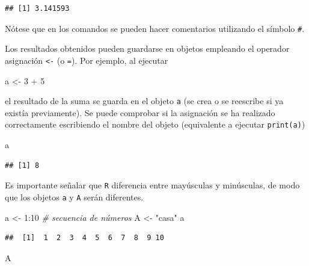 \documentclass[
]{book}
\newenvironment{Shaded}{\begin{snugshade}}{\end{snugshade}}
\newcommand{\CommentTok}[1]{\textcolor[rgb]{0.56,0.35,0.01}{\textit{#1}}}
\newcommand{\DecValTok}[1]{\textcolor[rgb]{0.00,0.00,0.81}{#1}}
\newcommand{\NormalTok}[1]{#1}
\newcommand{\OtherTok}[1]{\textcolor[rgb]{0.56,0.35,0.01}{#1}}
\newcommand{\SpecialCharTok}[1]{\textcolor[rgb]{0.00,0.00,0.00}{#1}}
\newcommand{\StringTok}[1]{\textcolor[rgb]{0.31,0.60,0.02}{#1}}
\theoremstyle{break}
\theoremstyle{nonumberplain}
\begin{document}
\begin{verbatim}
## [1] 3.141593
\end{verbatim}

Nótese que en los comandos se pueden hacer comentarios utilizando el símbolo \texttt{\#}.

Los resultados obtenidos pueden guardarse en objetos empleando el operador asignación \texttt{\textless{}-} (o \texttt{=}).
Por ejemplo, al ejecutar

\begin{Shaded}
\begin{Highlighting}[]
\NormalTok{a }\OtherTok{\textless{}{-}} \DecValTok{3} \SpecialCharTok{+} \DecValTok{5}
\end{Highlighting}
\end{Shaded}

el resultado de la suma se guarda en el objeto \texttt{a} (se crea o se reescribe si ya existía previamente).
Se puede comprobar si la asignación se ha realizado correctamente escribiendo el nombre del objeto (equivalente a ejecutar \texttt{print(a)})

\begin{Shaded}
\begin{Highlighting}[]
\NormalTok{a}
\end{Highlighting}
\end{Shaded}

\begin{verbatim}
## [1] 8
\end{verbatim}

Es importante señalar que \texttt{R} diferencia entre mayúsculas y
minúsculas, de modo que los objetos \texttt{a} y \texttt{A} serán diferentes.

\begin{Shaded}
\begin{Highlighting}[]
\NormalTok{a }\OtherTok{\textless{}{-}} \DecValTok{1}\SpecialCharTok{:}\DecValTok{10} \CommentTok{\# secuencia de números}
\NormalTok{A }\OtherTok{\textless{}{-}} \StringTok{"casa"}
\NormalTok{a}
\end{Highlighting}
\end{Shaded}

\begin{verbatim}
##  [1]  1  2  3  4  5  6  7  8  9 10
\end{verbatim}

\begin{Shaded}
\begin{Highlighting}[]
\NormalTok{A}
\end{Highlighting}
\end{Shaded}
\end{document}
